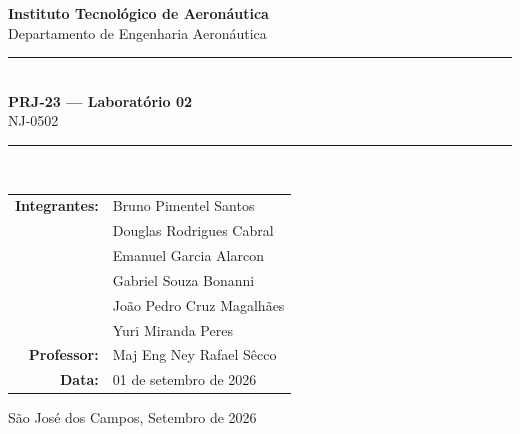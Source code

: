\documentclass[11pt,a4paper]{article}
\begin{document}
\begin{titlepage}
  \centering
  \vspace*{1cm}

  {\Large \textbf{Instituto Tecnológico de Aeronáutica}} \\[0.4cm]
  {\large Departamento de Engenharia Aeronáutica} \\[1.5cm]

  \rule{\linewidth}{1pt} \\[0.4cm]
  {\LARGE \textbf{PRJ-23 — Laboratório 02}} \\[0.3cm]
  {\Large NJ-0502 } \\[0.3cm]
  \rule{\linewidth}{1pt} \\[2cm]

  \begin{tabular}{rl}
    \textbf{Integrantes:}  & Bruno Pimentel Santos \\
                           & Douglas Rodrigues Cabral \\
                           & Emanuel Garcia Alarcon \\
                           & Gabriel Souza Bonanni \\
                           & João Pedro Cruz Magalhães \\
                           & Yuri Miranda Peres \\[0.6cm]
    \textbf{Professor:}    & Maj Eng Ney Rafael Sêcco \\[0.6cm]
    \textbf{Data:}      & 01 de setembro de 2026 \\
  \end{tabular}

  \vfill
  {\small São José dos Campos, Setembro de 2026}
\end{titlepage}

\newpage
\end{document}
